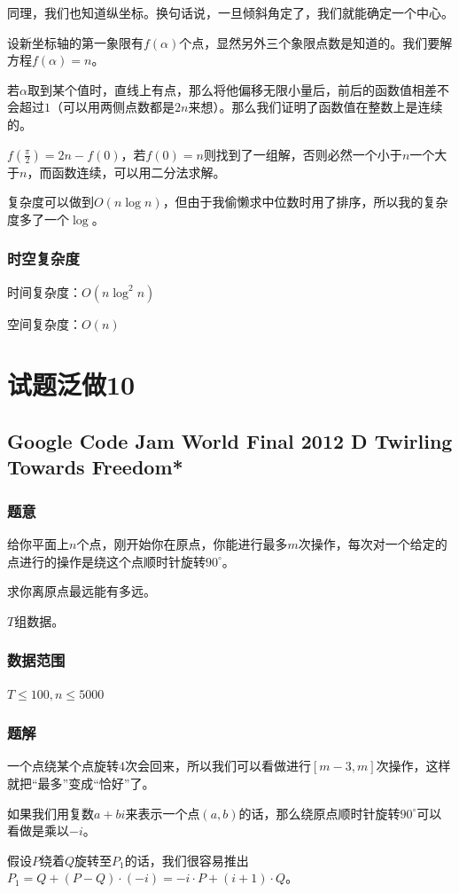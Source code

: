 \documentclass{ctexart}
\begin{document}
同理，我们也知道纵坐标。换句话说，一旦倾斜角定了，我们就能确定一个中心。

设新坐标轴的第一象限有$f(\alpha)$个点，显然另外三个象限点数是知道的。我们要解方程$f(\alpha)=n$。

若$\alpha$取到某个值时，直线上有点，那么将他偏移无限小量后，前后的函数值相差不会超过$1$（可以用两侧点数都是$2n$来想）。那么我们证明了函数值在整数上是连续的。

$f(\frac{\pi}{2})=2n-f(0)$，若$f(0)=n$则找到了一组解，否则必然一个小于$n$一个大于$n$，而函数连续，可以用二分法求解。

复杂度可以做到$O(n \log n)$，但由于我偷懒求中位数时用了排序，所以我的复杂度多了一个$\log$。
\subsubsection{时空复杂度}
时间复杂度：$O(n \log^2 n)$

空间复杂度：$O(n)$
\newpage
\section{试题泛做10}
\subsection{Google Code Jam World Final 2012 D Twirling Towards Freedom*}
\subsubsection{题意}
给你平面上$n$个点，刚开始你在原点，你能进行最多$m$次操作，每次对一个给定的点进行的操作是绕这个点顺时针旋转$90^{\circ}$。

求你离原点最远能有多远。

$T$组数据。
\subsubsection{数据范围}
$T \le 100,n \le 5000$
\subsubsection{题解}
一个点绕某个点旋转$4$次会回来，所以我们可以看做进行$[m-3,m]$次操作，这样就把“最多”变成“恰好”了。

如果我们用复数$a+bi$来表示一个点$(a,b)$的话，那么绕原点顺时针旋转$90^{\circ}$可以看做是乘以$-i$。

假设$P$绕着$Q$旋转至$P_1$的话，我们很容易推出$P_1=Q+(P-Q)\cdot (-i)=-i\cdot P+(i+1)\cdot Q$。
\end{document}
